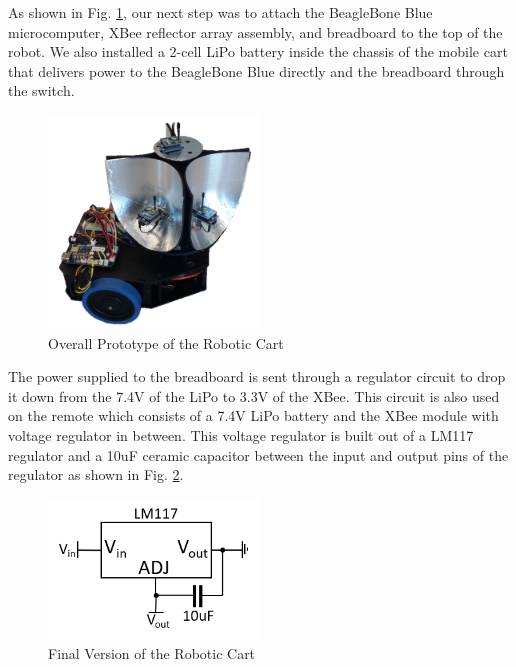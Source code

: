 \vspace*{12pt}
\noindent
As shown in Fig. \ref{fig:FinalizedRobot}, our next step was to attach the BeagleBone Blue microcomputer, XBee reflector array assembly, and breadboard to the top of the robot. We also installed a 2-cell LiPo battery inside the chassis of the mobile cart that delivers power to the BeagleBone Blue directly and the breadboard through the switch.

\begin{figure}[H]
    \centering
    \includegraphics[width=0.5\textwidth]{figs/img/Finalized_robot.png}
    \caption{Overall Prototype of the Robotic Cart}
    \label{fig:FinalizedRobot}
\end{figure}

The power supplied to the breadboard is sent through a regulator circuit to drop it down from the 7.4V of the LiPo to 3.3V of the XBee. This circuit is also used on the remote which consists of a 7.4V LiPo battery and the XBee module with voltage regulator in between. This voltage regulator is built out of a LM117 regulator and a 10uF ceramic capacitor between the input and output pins of the regulator as shown in Fig. \ref{fig:PowerConverter}.

\begin{figure}[H]
    \centering
    \includegraphics[width=0.5\textwidth]{figs/img/PowerConverter.png}
    \caption{Final Version of the Robotic Cart}
    \label{fig:PowerConverter}
\end{figure}

